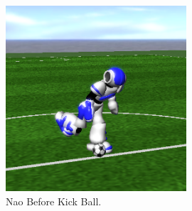 \begin{description}
  \begin{figure}[!h]
\centering
  \includegraphics[width=0.6\textwidth]{Chapter3/figures/NaoKick.png}
  \caption{Nao Before Kick Ball.}
  \label{fig:NaoKick}
\end{figure}
\end{description}

